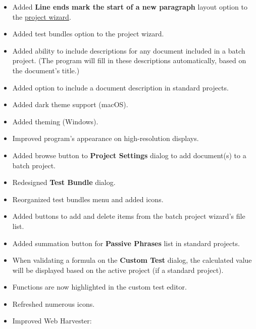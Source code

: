 \documentclass[
]{book}
\providecommand{\tightlist}{%
  \setlength{\itemsep}{0pt}\setlength{\parskip}{0pt}}
\theoremstyle{definition}
\theoremstyle{definition}
\theoremstyle{definition}
\theoremstyle{definition}
\theoremstyle{remark}
\begin{document}
\begin{itemize}
\tightlist
\item
  Added \textbf{Line ends mark the start of a new paragraph} layout option to the \protect\hyperlink{creating-standard-project}{project wizard}.
\item
  Added test bundles option to the project wizard.
\item
  Added ability to include descriptions for any document included in a batch project. (The program will fill in these descriptions automatically, based on the document's title.)
\item
  Added option to include a document description in standard projects.
\item
  Added dark theme support (macOS).
\item
  Added theming (Windows).
\item
  Improved program's appearance on high-resolution displays.
\item
  Added browse button to \textbf{Project Settings} dialog to add document(s) to a batch project.
\item
  Redesigned \textbf{Test Bundle} dialog.
\item
  Reorganized test bundles menu and added icons.
\item
  Added buttons to add and delete items from the batch project wizard's file list.
\item
  Added summation button for \textbf{Passive Phrases} list in standard projects.
\item
  When validating a formula on the \textbf{Custom Test} dialog, the calculated value will be displayed based on the active project (if a standard project).
\item
  Functions are now highlighted in the custom test editor.
\item
  Refreshed numerous icons.
\item
  Improved Web Harvester:


\end{itemize}
\end{document}
